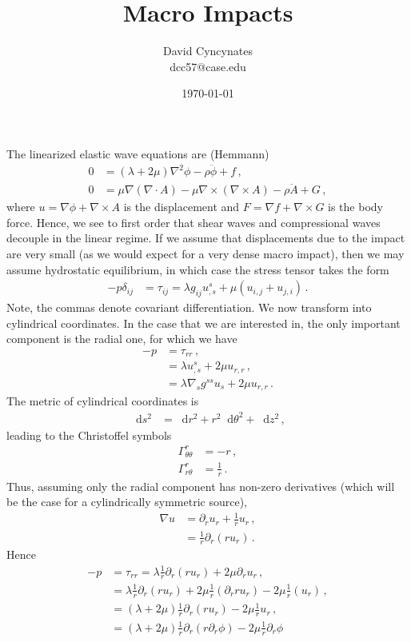 \documentclass{article}
\title{Macro Impacts}
\author{David Cyncynates \\ dcc57@case.edu}
\date{\today}
\newcommand*\diff{\mathop{}\!\mathrm{d}}
\newcommand*\f[2]{\frac{#1}{#2}}
\begin{document}
\maketitle
The linearized elastic wave equations are (Hemmann)
\begin{align}
0&=(\lambda+2\mu)\nabla^2\phi-\rho\ddot\phi+f\,,\\
0&=\mu\nabla(\nabla\cdot A)-\mu\nabla\times(\nabla\times A)-\rho\ddot A+G\,,
\end{align}
where $u=\nabla\phi+\nabla\times A$ is the displacement and $F=\nabla f+\nabla\times G$ is the body force. Hence, we see to first order that shear waves and compressional waves decouple in the linear regime. If we assume that displacements due to the impact are very small (as we would expect for a very dense macro impact), then we may assume hydrostatic equilibrium, in which case the stress tensor takes the form
\begin{align}
-p\delta_{ij}&=\tau_{ij}=\lambda g_{ij} u^s_{,s}+\mu(u_{i,j}+u_{j,i})\,.
\end{align}
Note, the commas denote covariant differentiation. We now transform into cylindrical coordinates. In the case that we are interested in, the only important component is the radial one, for which we have
\begin{align}
-p&=\tau_{rr}\,,\\
&=\lambda u^s_{,s}+2\mu u_{r,r}\,,\\
&=\lambda \nabla_{s}g^{ss}u_s+2\mu u_{r,r}\,.
\end{align}
The metric of cylindrical coordinates is
\begin{align}
\diff s^2&=\diff r^2+r^2\diff\theta^2+\diff z^2\,,
\end{align}
leading to the Christoffel symbols
\begin{align}
\Gamma^r_{\theta\theta}&=-r\,,\\
\Gamma^r_{r\theta}&=\f1r\,.
\end{align}
Thus, assuming only the radial component has non-zero derivatives (which will be the case for a cylindrically symmetric source),
\begin{align}
\nabla u&=\partial_r u_r+\f1r u_r\,,\\
&=\f1r\partial_r(ru_r)\,.
\end{align}
Hence
\begin{align}
-p&=\tau_{rr}=\lambda\f1r\partial_r(ru_r)+2\mu\partial_r u_r\,,\\
&=\lambda\f1r\partial_r(ru_r)+2\mu\f1r(\partial_r ru_r)-2\mu\f1r(u_r)\,,\\
&=(\lambda+2\mu)\f1r\partial_r(ru_r)-2\mu\f1ru_r\,,\\
&=(\lambda+2\mu)\f1r\partial_r(r\partial_r\phi)-2\mu\f1r\partial_r\phi
\end{align}
\end{document}
